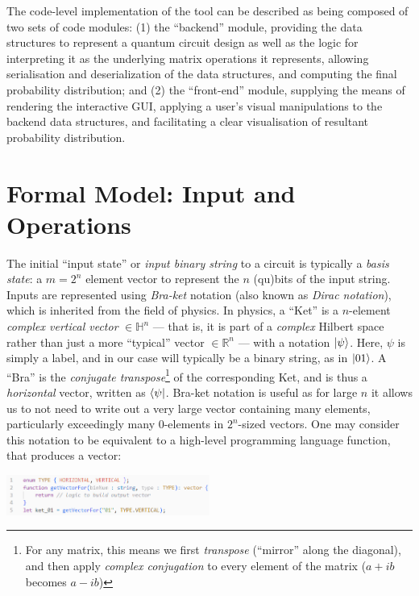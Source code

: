 \documentclass[conference]{IEEEtran}
\begin{document}
The code-level implementation of the tool can be described as being composed of two sets of code modules: (1) the
``backend'' module, providing the data structures to represent a quantum circuit design as well as the logic for interpreting
it as the underlying matrix operations it represents, allowing serialisation and deserialization of the data
structures, and computing the final probability distribution; and (2) the ``front-end'' module, supplying the means of rendering the
interactive GUI, applying a user's visual manipulations to the backend data structures,
and facilitating a clear visualisation of resultant probability distribution.

\section{Formal Model: Input and Operations}
\label{sec:MathematicsBehindAQuantumCircuit}

The initial ``input state'' or \textit{input binary string} to a circuit is typically a \textit{basis state}:
a $m=2^n$ element vector to represent the $n$ (qu)bits of the input string.
Inputs are represented using \textit{Bra-ket} notation (also known as \textit{Dirac notation}), which is inherited from the field of physics.
In physics, a ``Ket'' is a $n$-element \textit{complex vertical vector} $\in \mathbb{H}^n$
— that is, it is part of a \textit{complex} Hilbert space rather than just a more ``typical'' vector $\in \mathbb{R}^n$ —
with a notation $\ket{\psi}$. Here, $\psi$ is simply a label, and
in our case will typically be a binary string, as in $\ket{01}$.
A ``Bra'' is the \textit{conjugate transpose}\footnote{For any matrix,
this means we first \textit{transpose} (``mirror'' along the diagonal),
and then apply \textit{complex conjugation} to every element of the matrix ($a + ib$ becomes $a - ib$)}
of the corresponding Ket, and is thus a \textit{horizontal} vector,
written as $\bra{\psi}$.
Bra-ket notation is useful as for large $n$ it allows us to not need to write out a very large vector containing many elements,
particularly exceedingly many 0-elements in $2^n$-sized vectors.
One may consider this notation to be equivalent to a high-level programming language function,
that produces a vector:

\centerline{
    \includegraphics[width=0.5\textwidth]{img/build_a_ket_code_block.png}
}
\end{document}
